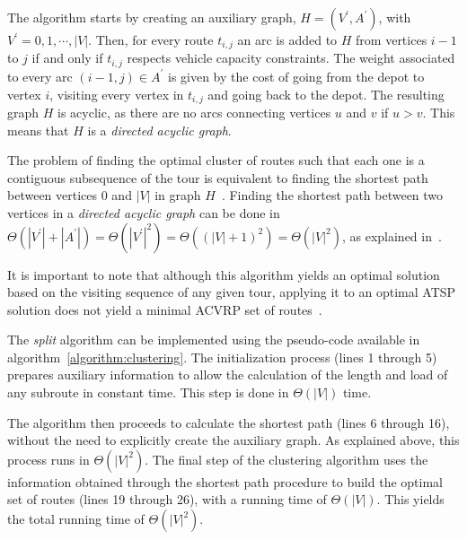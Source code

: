 The algorithm starts by creating an auxiliary graph, $H = (V^\prime,
A^\prime)$, with $V^\prime = {0, 1, \cdots, |V|}$. Then, for every route
$t_{i,j}$ an arc is added to $H$ from vertices $i-1$ to $j$ if and only if
$t_{i,j}$ respects vehicle capacity constraints. The weight associated to every
arc $(i - 1, j) \in A^\prime$ is given by the cost of going from the depot to
vertex $i$, visiting every vertex in $t_{i,j}$ and going back to the depot. The
resulting graph $H$ is acyclic, as there are no arcs connecting vertices $u$
and $v$ if $u > v$. This means that $H$ is a \textit{directed acyclic graph}.

The problem of finding the optimal cluster of routes such that each one is a
contiguous subsequence of the tour is equivalent to finding the shortest path
between vertices $0$ and $|V|$ in graph $H$~\citep{Beasley1983}. Finding the
shortest path between two vertices in a \textit{directed acyclic graph} can be
done in $\Theta(|V^\prime| + |A^\prime|) = \Theta(|V^\prime|^2) = \Theta((|V| +
1)^2) = \Theta(|V|^2)$, as explained in~\citet{Manber1989}.

It is important to note that although this algorithm yields an optimal solution
based on the visiting sequence of any given tour, applying it to an optimal ATSP
solution does not yield a minimal ACVRP set of routes~\cite{Beasley1983}.

The \textit{split} algorithm can be implemented using the pseudo-code available
in algorithm~\ref{algorithm:clustering}. The initialization process (lines 1
through 5) prepares auxiliary information to allow the calculation of the length
and load of any subroute in constant time. This step is done in $\Theta(|V|)$
time.

The algorithm then proceeds to calculate the shortest path (lines 6 through 16),
without the need to explicitly create the auxiliary graph. As explained above,
this process runs in $\Theta(|V|^2)$. The final step of the clustering algorithm
uses the information obtained through the shortest path procedure to build the
optimal set of routes (lines 19 through 26), with a running time of
$\Theta(|V|)$. This yields the total running time of $\Theta(|V|^2)$.

\vspace{1cm}


